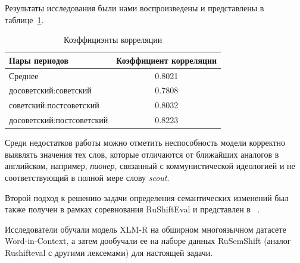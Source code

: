 \documentclass[LI,VKR]{HSEUniversity}
\begin{document}

Результаты исследования были нами воспроизведены и представлены в таблице~\ref{tab:GlossReader}.

\begin{table}[H]
\centering
\caption{Коэффициэнты корреляции}
\label{tab:GlossReader}
\begin{tabular}{|l|c|}
\hline
Пары периодов                  & Коэффициент корреляции \\
\hline
Среднее            & 0.8021                  \\
\hline
досоветский:советский           & 0.7808                  \\
\hline
советский:постсоветский          & 0.8032                  \\
\hline
досоветский:постсоветский      & 0.8223                  \\
\hline
\end{tabular}
\end{table}

Среди недостатков работы можно отметить неспособность модели корректно выявлять
значения тех слов, которые отличаются от ближайших аналогов в английском, например,
\textit{пионер}, связанный с коммунистической идеологией и не соответствующий в полной мере
слову \textit{scout}.

Второй подход к решению задачи определения семантических изменений был также получен
в рамках соревнования RuShiftEval и представлен в ~\cite{DeepMistake}.

Исследователи обучали модель XLM-R на обширном многоязычном датасете Word-in-Context,
а затем дообучали ее на наборе данных RuSemShift (аналог Rushifteval с другими лексемами)
для настоящей задачи.
\end{document}
